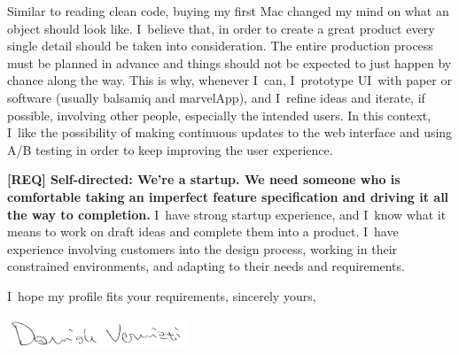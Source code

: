 \documentclass[a4paper,sans]{moderncv} %
\begin{document}
Similar to reading clean code, buying my first Mac changed my mind on what an object should look like.
I~believe that, in order to create a great product every single detail should be taken into consideration.
The entire production process must be planned in advance and things should not be expected to just happen by chance along the way.
This is why, whenever I~can, I~prototype UI~with paper or software (usually balsamiq and marvelApp), and I~refine ideas and iterate, if possible, involving other people, especially the intended users.
In this context, I~like the possibility of making continuous updates to the web interface and using A/B testing in order to keep improving the user experience.

\textbf{[REQ] Self-directed: We’re a startup. We need someone who is comfortable taking an imperfect feature specification and driving it all the way to completion.}
I~have strong startup experience, and I~know what it means to work on draft ideas and complete them into a product. I~have experience involving customers into the design process, working in their constrained environments, and adapting to their needs and requirements.

I~hope my profile fits your requirements, sincerely yours,

\vspace{1.5em}

\includegraphics[width=0.4\textwidth]{FirmaPenna}
\makeletterclosing %


\end{document}
